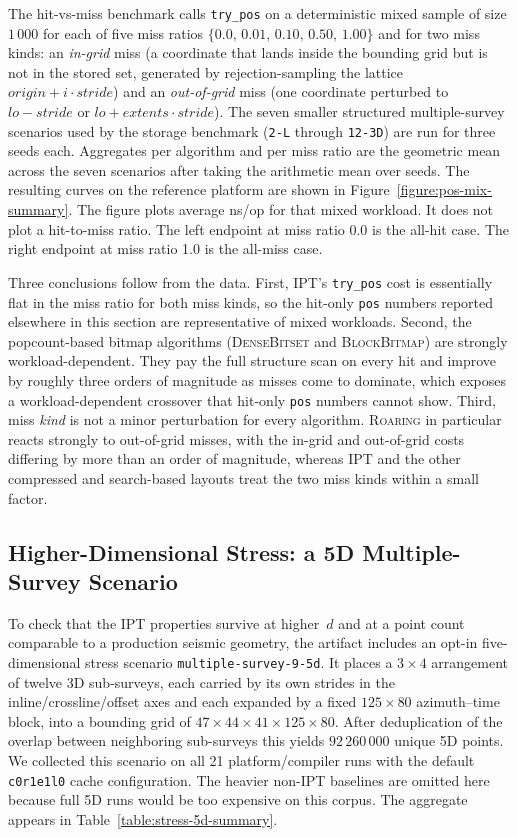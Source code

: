 \documentclass[manuscript,screen,review]{acmart}
\theoremstyle{definition}
\theoremstyle{plain}
\begin{document}
The hit-vs-miss benchmark calls \texttt{try\_pos} on a deterministic
mixed sample of size
$1\,000$ for each of five miss ratios
$\{0.0,\,0.01,\,0.10,\,0.50,\,1.00\}$ and for two miss kinds: an
\emph{in-grid} miss (a coordinate that lands inside the bounding grid but
is not in the stored set, generated by rejection-sampling the lattice
$origin + i\cdot stride$) and an \emph{out-of-grid} miss (one
coordinate perturbed to $lo - stride$ or $lo + extents\cdot stride$).
The seven smaller structured multiple-survey scenarios used by the
storage benchmark
(\texttt{2-L} through \texttt{12-3D})
are run for three seeds each. Aggregates per algorithm and per miss
ratio are the geometric mean across the seven scenarios after taking
the arithmetic mean over seeds. The resulting curves on the reference
platform are shown in Figure~\ref{figure:pos-mix-summary}. The figure
plots average ns/op for that mixed workload. It does not plot a
hit-to-miss ratio. The left endpoint at miss ratio 0.0 is the
all-hit case. The right endpoint at miss ratio 1.0 is the all-miss
case.

Three conclusions follow from the data. First, IPT's \texttt{try\_pos}
cost is essentially flat in the miss ratio for both miss kinds, so
the hit-only \texttt{pos} numbers reported elsewhere in this section
are representative of mixed workloads. Second, the popcount-based
bitmap algorithms (\textsc{DenseBitset} and \textsc{BlockBitmap}) are
strongly workload-dependent. They pay the full structure scan on
every hit and improve by roughly three orders of magnitude as misses
come to dominate, which exposes a workload-dependent crossover that
hit-only \texttt{pos} numbers cannot show. Third, miss \emph{kind}
is not a minor perturbation for every algorithm. \textsc{Roaring} in
particular reacts strongly to out-of-grid misses, with the in-grid
and out-of-grid costs differing by more than an order of magnitude,
whereas IPT and the other compressed and search-based layouts treat
the two miss kinds within a small factor.

\subsection{Higher-Dimensional Stress: a 5D Multiple-Survey Scenario}
\label{section:results-stress-5d}

To check that the IPT properties survive at higher~$d$ and at a point
count comparable to a production seismic geometry, the artifact
includes an opt-in five-dimensional stress scenario
\texttt{multiple-survey-9-5d}. It places a $3\times 4$
arrangement of twelve 3D sub-surveys, each carried by its own strides
in the inline/crossline/offset axes and each expanded by a fixed
$125\times 80$ azimuth--time block, into a bounding grid of
$47\times 44\times 41\times 125\times 80$. After deduplication of the
overlap between neighboring sub-surveys this yields $92\,260\,000$
unique 5D points. We collected this scenario on all 21
platform/compiler runs with the default \texttt{c0r1e1l0}
cache configuration. The heavier non-IPT baselines are omitted here
because full 5D runs would be too expensive on this corpus. The aggregate appears
in Table~\ref{table:stress-5d-summary}.
\end{document}
